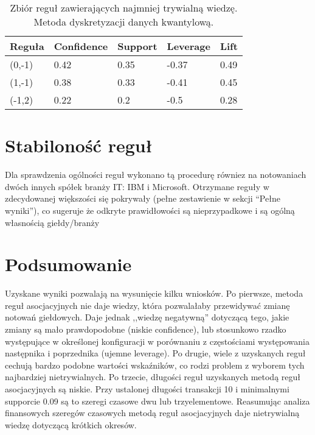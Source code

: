 \documentclass[a4paper,10pt]{article}
\begin{document}
\begin{center}
\begin{table}
\centering
\caption{Zbiór reguł zawierających najmniej trywialną wiedzę. Metoda dyskretyzacji danych kwantylową.}
\begin{tabular}{|l|l|l|l|l|} 
\hline
\bf{Reguła} & \bf{Confidence} & \bf{Support} & \bf{Leverage} & \bf{Lift} \\ \hline
(0,-1) & 0.42 & 0.35 & -0.37 & 0.49  \\ \hline
(1,-1) & 0.38 & 0.33 & -0.41 & 0.45 \\ \hline
(-1,2) & 0.22 & 0.2 & -0.5 & 0.28 \\ \hline
\end{tabular}
\label{tab:k2}
\end{table}
\end{center}

\section{Stabiloność reguł}
Dla sprawdzenia ogólności reguł wykonano tą procedurę równiez na notowaniach dwóch innych spółek branży IT: IBM i Microsoft. 
Otrzymane reguły w zdecydowanej większości się pokrywały (pełne zestawienie w sekcji ``Pełne wyniki''), co sugeruje że odkryte prawidłowości są nieprzypadkowe i są ogólną własnością giełdy/branży

\section{Podsumowanie}
Uzyskane wyniki pozwalają na wysunięcie kilku wniosków. Po pierwsze, metoda reguł asocjacyjnych nie daje wiedzy, która pozwalałaby przewidywać zmianę notowań
giełdowych. Daje jednak ,,wiedzę negatywną'' dotyczącą tego, jakie zmiany są mało prawdopodobne (niskie confidence), lub stosunkowo rzadko występujące w określonej konfiguracji w porównaniu z częstościami występowania następnika i poprzednika (ujemne leverage). Po drugie, wiele z uzyskanych reguł cechują bardzo podobne wartości wskaźników, co rodzi problem z wyborem tych najbardziej 
nietrywialnych. Po trzecie, długości reguł uzyskanych metodą reguł asocjacyjnych są niskie. Przy ustalonej długości transakcji 10 i minimalnymi supporcie 0.09 są to szeregi czasowe dwu lub trzyelementowe. Reasumując analiza finansowych szeregów czasowych metodą reguł asocjacyjnych daje nietrywialną wiedzę dotyczącą krótkich okresów.
\end{document}
